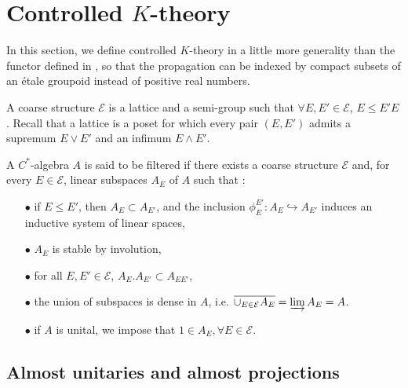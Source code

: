 \section{Controlled $K$-theory}

In this section, we define controlled $K$-theory in a little more generality than the functor defined in \cite{OY2}, so that the propagation can be indexed by compact subsets of an étale groupoid instead of positive real numbers.\\

\begin{definition}
A coarse structure $\mathcal E$ is a lattice and a semi-group such that $\forall E,E'\in \mathcal E$, $E\leq E'E$. Recall that a lattice is a poset for which every pair $(E,E')$ admits a supremum $E\vee E'$ and an infimum $E\wedge E'$.
\end{definition}

\begin{definition}
A $C^*$-algebra $A$ is said to be filtered if there exists a coarse structure $\mathcal E$ and, for every $E\in \mathcal E$, linear subspaces $A_E$ of $A$ such that :\\
\begin{itemize}
\item[$\bullet$] if $E \leq E'$, then $A_E\subset A_{E'}$, and the inclusion $\phi_E^{E'}: A_E\hookrightarrow A_{E'}$ induces an inductive system of linear spaces,
\item[$\bullet$] $A_E$ is stable by involution,
\item[$\bullet$] for all $E,E'\in\mathcal E$, $A_E.A_{E'}\subset A_{EE'}$,
\item[$\bullet$] the union of subspaces is dense in $A$, i.e. $\overline{\cup_{E\in\mathcal E}A_E} = \varinjlim A_E = A$.
\item[$\bullet$] if $A$ is unital, we impose that $1\in A_E,\forall E\in\mathcal E$.\\
\end{itemize}
\end{definition}

\subsection{Almost unitaries and almost projections}

